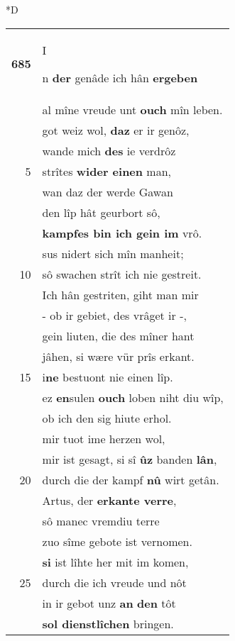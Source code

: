 \documentclass[8pt,a4paper,notitlepage]{article}
\begin{document}
\begin{table}[ht]
\begin{minipage}[t]{0.5\linewidth}
\small
\begin{center}*D
\end{center}
\begin{tabular}{rl}
\textbf{685} & \begin{large}I\end{large}n \textbf{der} genâde ich hân \textbf{ergeben}\\ 
 & al mîne vreude unt \textbf{ouch} mîn leben.\\ 
 & got weiz wol, \textbf{daz} er ir genôz,\\ 
 & wande mich \textbf{des} ie verdrôz\\ 
5 & strîtes \textbf{wider einen} man,\\ 
 & wan daz der werde Gawan\\ 
 & den lîp hât geurbort sô,\\ 
 & \textbf{kampfes bin ich gein im} vrô.\\ 
 & sus nidert sich mîn manheit;\\ 
10 & sô swachen strît ich nie gestreit.\\ 
 & Ich hân gestriten, giht man mir\\ 
 & - ob ir gebiet, des vrâget ir -,\\ 
 & gein liuten, die des mîner hant\\ 
 & jâhen, si wære vür prîs erkant.\\ 
15 & i\textbf{ne} bestuont nie einen lîp.\\ 
 & ez \textbf{en}sulen \textbf{ouch} loben niht diu wîp,\\ 
 & ob ich den sig hiute erhol.\\ 
 & mir tuot ime herzen wol,\\ 
 & mir ist gesagt, si sî \textbf{ûz} banden \textbf{lân},\\ 
20 & durch die der kampf \textbf{nû} wirt getân.\\ 
 & Artus, der \textbf{erkante verre},\\ 
 & sô manec vremdiu terre\\ 
 & zuo sîme gebote ist vernomen.\\ 
 & \textbf{si} ist lîhte her mit im komen,\\ 
25 & durch die ich vreude und nôt\\ 
 & in ir gebot unz \textbf{an} \textbf{den} tôt\\ 
 & \textbf{sol dienstlîchen} bringen.\\ 

\end{tabular}
\end{minipage}
\end{table}
\end{document}
